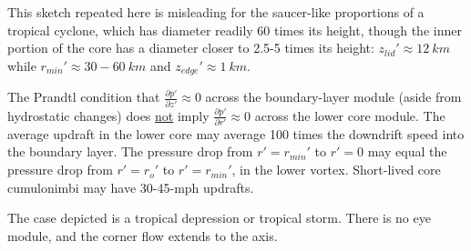 \documentclass[preprint, prX]{revtex4}
\newcommand{\pd}[2]{\frac{\partial#1}{\partial#2}}
\newcommand{\rmin}{r_{min}}
\newcommand{\zedge}{z_{edge}}
\begin{document}
This sketch repeated here is misleading for the saucer-like proportions of a tropical cyclone, which has diameter readily 60 times its height, though the inner portion of the core has a diameter closer to 2.5-5 times its height:
$z_{lid}' \approx 12\ \si{km}$ while $\rmin' \approx 30-60\ \si{km}$ and $\zedge' \approx 1\ \si{km}$.

The Prandtl condition that $\pd{p'}{z'} \approx	0$ across the boundary-layer module (aside from hydrostatic changes) does \underline{not} imply $\pd{p'}{r'} \approx 0$ across the lower core module. The average updraft in the lower core may average 100 times the downdrift speed into the boundary layer. The pressure drop from $r'=\rmin'$ to $r'=0$ may equal the pressure drop from $r'=r_o'$ to $r'=\rmin'$, in the lower vortex. Short-lived core cumulonimbi may have 30-45-mph updrafts.

The case depicted is a tropical depression or tropical storm. There is no eye module, and the corner flow extends to the axis.
\end{document}
